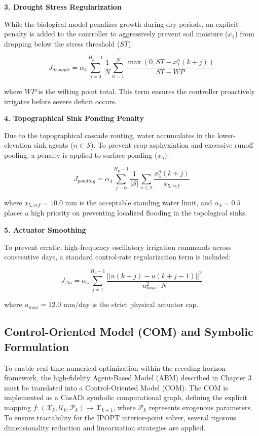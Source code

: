 \documentclass[11pt, a4paper]{article}
\begin{document}
\textbf{3. Drought Stress Regularization} 

While the biological model penalizes growth during dry periods, an explicit penalty is added to the controller to aggressively prevent soil moisture ($x_1$) from dropping below the stress threshold ($ST$):

\begin{equation}
    J_{drought} = \alpha_3 \sum_{j=0}^{H_p-1} \frac{1}{N} \sum_{n=1}^{N} \frac{\max(0, ST - x_1^n(k+j))}{ST - WP}
\end{equation}

where $WP$ is the wilting point total. This term ensures the controller proactively irrigates before severe deficit occurs.

\textbf{4. Topographical Sink Ponding Penalty}

Due to the topographical cascade routing, water accumulates in the lower-elevation sink agents ($n \in \mathcal{S}$). To prevent crop asphyxiation and excessive runoff pooling, a penalty is applied to surface ponding ($x_5$):

\begin{equation}
    J_{ponding} = \alpha_4 \sum_{j=0}^{H_p-1} \frac{1}{|\mathcal{S}|} \sum_{n \in \mathcal{S}} \frac{x_5^n(k+j)}{x_{5,ref}}
\end{equation}

where $x_{5,ref} = 10.0$ mm is the acceptable standing water limit, and $\alpha_4 = 0.5$ places a high priority on preventing localized flooding in the topological sinks.

\textbf{5. Actuator Smoothing} 

To prevent erratic, high-frequency oscillatory irrigation commands across consecutive days, a standard control-rate regularization term is included:

\begin{equation}
    J_{\Delta u} = \alpha_5 \sum_{j=1}^{H_p-1} \frac{||u(k+j) - u(k+j-1)||^2}{u_{max}^2 \cdot N}
\end{equation}

where $u_{max} = 12.0$ mm/day is the strict physical actuator cap.

\subsection{Control-Oriented Model (COM) and Symbolic Formulation}

To enable real-time numerical optimization within the receding horizon framework, the high-fidelity Agent-Based Model (ABM) described in Chapter 3 must be translated into a Control-Oriented Model (COM). The COM is implemented as a CasADi symbolic computational graph, defining the explicit mapping $f: (\mathcal{X}_k, \mathcal{U}_k, \mathcal{P}_k) \to \mathcal{X}_{k+1}$, where $\mathcal{P}_k$ represents exogenous parameters. To ensure tractability for the IPOPT interior-point solver, several rigorous dimensionality reduction and linearization strategies are applied.
\end{document}
